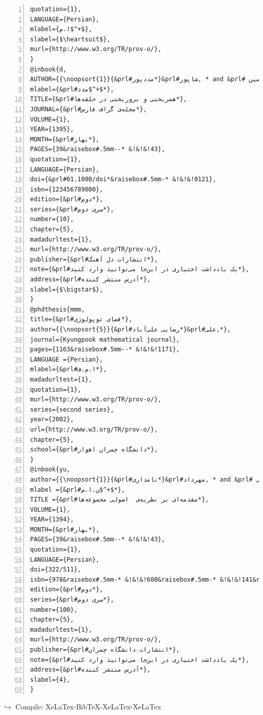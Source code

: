 \documentclass{article}
\begin{document}
\begin{Verbatim}[numbers=left,fontsize=\bf,commandchars=\&\#\*,baselinestretch=1,firstnumber=1,formatcom=\color{green!50!black}]
quotation={1},
LANGUAGE={Persian},
mlabel={ا.م$^+$},
slabel={$\heartsuit$},
murl={http://www.w3.org/TR/prov-o/},
}
@inbook{d,
AUTHOR={{\noopsort{1}}{&prl#مددپور*}&prl#شاپور, * and &prl# مددپور ,محمدحسین*and &prl#سایرین*},
mlabel={&prl#مدد$^+$*},
TITLE={&prl#همریختی و بروریختی در حلقه‌ها*},
JOURNAL={&prl#مجله‌ی گراف فارس*},
VOLUME={1},
YEAR={1395},
MONTH={&prl#بهار*},
PAGES={39&raisebox#.5mm--* &!&!&!43},
quotation={1},
LANGUAGE={Persian},
doi={&prl#01.1000/doi*&raisebox#.5mm-* &!&!&!0121},
isbn={123456789000},
edition={&prl#دوم*},
series={&prl#سری دوم*},
number={10},
chapter={5},
madadurltest={1},
murl={http://www.w3.org/TR/prov-o/},
publisher={&prl#انتشارات دل آهنگ*},
note={&prl#یک یادداشت اختیاری در این‌جا می‌توانید وارد کنید*},
address={‌&prl#آدرس منتشر کننده*},
slabel={$\bigstar$},
}
@phdthesis{mmm,
title={&prl#فضای توپولوژی*},
author={{\noopsort{5}}{&prl#رضایی علی‌آباد*}&prl#علی,*},
journal={Kyungpook mathematical journal},
pages={1163&raisebox#.5mm--* &!&!&!1171},
LANGUAGE ={Persian},
mlabel={&prl#ا.م.ف*},
madadurltest={1},
quotation={1},
murl={http://www.w3.org/TR/prov-o/},
series={second series},
year={2002},
url={http://www.w3.org/TR/prov-o/},
chapter={5},
school={&prl#دانشگاه چمران اهواز*},
}
@inbook{yu,
author={{\noopsort{1}}{&prl#نامداری*}&prl#مهرداد, * and &prl# کوچک‌پور ,عبدعلی*},
mlabel ={&prl#ن.ا.م$^+$*},
TITLE ={&prl#مقدمه‌ای بر نظریه‌ی  اصولی مجموعه‌ها*},
VOLUME={1},
YEAR={1394},
MONTH={&prl#بهار*},
PAGES={39&raisebox#.5mm--* &!&!&!43},
quotation={1},
LANGUAGE={Persian},
doi={322/511},
isbn={978&raisebox#.5mm-* &!&!&!600&raisebox#.5mm-* &!&!&!141&raisebox#.5mm-* &!&!&!173&raisebox#.5mm-* &!&!&!1},
edition={&prl#دوم*},
series={&prl#سری دوم*},
number={100},
chapter={5},
madadurltest={1},
murl={http://www.w3.org/TR/prov-o/},
publisher={&prl#انتشارات دانشگاه چمران*},
note={&prl#یک یادداشت اختیاری در این‌جا می‌توانید وارد کنید*},
address={&prl#آدرس منتشر کننده*},
slabel={4},
}
\end{Verbatim}
\begin{latin}
{\color{blue}$\hookrightarrow$ Compile: XeLaTex-BibTeX-XeLaTex-XeLaTex}
\end{latin}
\end{document}
